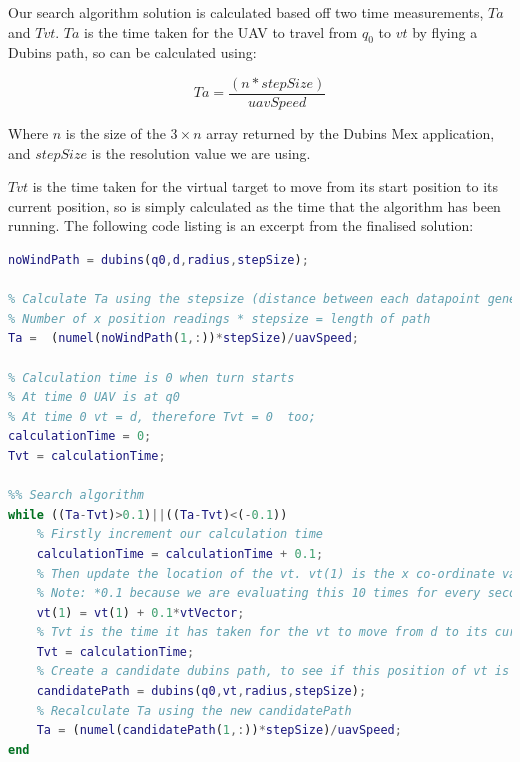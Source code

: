 Our search algorithm solution is calculated based off two time measurements, $Ta$ and $Tvt$. $Ta$ is the time taken for the UAV to travel from $q_0$ to $vt$ by flying a Dubins path, so can be calculated using:

\begin{equation}
	Ta = \frac{(n*stepSize)}{uavSpeed}
\end{equation}

Where $n$ is the size of the  $3 \times n$ array returned by the Dubins Mex application, and $stepSize$ is the resolution value we are using.

$Tvt$ is the time taken for the virtual target to move from its start position to its current position, so is simply calculated as the time that the algorithm has been running. The following code listing is an excerpt from the finalised solution:

\begin{minipage}{\linewidth}
\begin{lstlisting}[language=MATLAB]
% Ta starts as the time taken for the UAV to travel from q0 to d as if there was no wind, so
noWindPath = dubins(q0,d,radius,stepSize);

% Calculate Ta using the stepsize (distance between each datapoint generated by dubins function), and speed of uav.
% Number of x position readings * stepsize = length of path
Ta =  (numel(noWindPath(1,:))*stepSize)/uavSpeed; 

% Calculation time is 0 when turn starts
% At time 0 UAV is at q0
% At time 0 vt = d, therefore Tvt = 0  too;
calculationTime = 0;
Tvt = calculationTime;

%% Search algorithm
while ((Ta-Tvt)>0.1)||((Ta-Tvt)<(-0.1))
    % Firstly increment our calculation time
    calculationTime = calculationTime + 0.1;
    % Then update the location of the vt. vt(1) is the x co-ordinate value, this works because wind is always in only the x direction
    % Note: *0.1 because we are evaluating this 10 times for every second of calculationTime
    vt(1) = vt(1) + 0.1*vtVector;
    % Tvt is the time it has taken for the vt to move from d to its current location, so is equal to calculationTime
    Tvt = calculationTime;
    % Create a candidate dubins path, to see if this position of vt is a suitable solution for the search
    candidatePath = dubins(q0,vt,radius,stepSize);
    % Recalculate Ta using the new candidatePath
    Ta = (numel(candidatePath(1,:))*stepSize)/uavSpeed;
end
\end{lstlisting}
\end{minipage}

